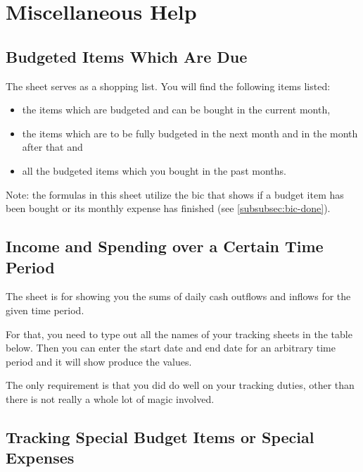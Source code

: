 \section{Miscellaneous Help}
\label{sec:miscellaneous-help}

\subsection{Budgeted Items Which Are Due}
\label{subsec:budgeted-items-which-are-due}

The sheet  serves as a shopping list.
You will find the following items listed:
\begin{itemize}
	\item the items which are budgeted and can be bought in the current month,
	\item the items which are to be fully budgeted in the next month and in the month after that and
	\item all the budgeted items which you bought in the past months.
\end{itemize}

Note: the formulas in this sheet utilize the \ac{bic}  that shows if a budget item has been bought or its monthly expense has finished (see \autoref{subsubsec:bic-done}).

\subsection{Income and Spending over a Certain Time Period}
\label{subsec:income-and-spending-certain-time-period}

The sheet  is for showing you the sums of daily cash outflows and inflows for the given time period.

For that, you need to type out all the names of your tracking sheets in the table below.
Then you can enter the start date and end date for an arbitrary time period and it will show produce the values.

The only requirement is that you did do well on your tracking duties, other than there is not really a whole lot of magic involved.

\subsection{Tracking Special Budget Items or Special Expenses}
\label{subsec:tracking-special-expenses}

